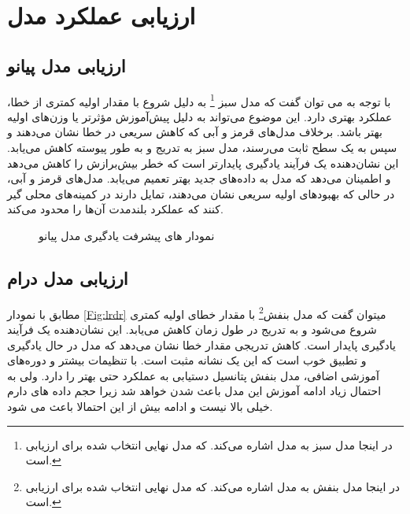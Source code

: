 \section{ارزیابی عملکرد مدل}
\subsection{ارزیابی مدل پیانو}

با توجه به  می توان گفت که مدل سبز \footnote{در اینجا مدل سبز به مدل   اشاره می‌کند. که مدل نهایی انتخاب شده برای ارزیابی است.} به دلیل شروع با مقدار اولیه کمتری از خطا، عملکرد بهتری دارد. این موضوع می‌تواند به دلیل پیش‌آموزش مؤثرتر یا وزن‌های اولیه بهتر باشد. برخلاف مدل‌های قرمز و آبی که کاهش سریعی در خطا نشان می‌دهند و سپس به یک سطح ثابت می‌رسند، مدل سبز به تدریج و به طور پیوسته کاهش می‌یابد. این نشان‌دهنده یک فرآیند یادگیری پایدارتر است که خطر بیش‌برازش را کاهش می‌دهد و اطمینان می‌دهد که مدل به داده‌های جدید بهتر تعمیم می‌یابد. مدل‌های قرمز و آبی، در حالی که بهبودهای اولیه سریعی نشان می‌دهند، تمایل دارند در کمینه‌های محلی گیر کنند که عملکرد بلندمدت آن‌ها را محدود می‌کند.
\begin{figure}%
      \centering
      \qquad
      \caption{نمودار های پیشرفت یادگیری مدل پیانو}%
      \label{Fig:lrpi}%
\end{figure}


\subsection{ارزیابی مدل درام}
مطابق با نمودار \ref{Fig:lrdr} میتوان گفت که
مدل بنفش\footnote{در اینجا مدل بنفش به مدل   اشاره می‌کند. که مدل نهایی انتخاب شده برای ارزیابی است.} با مقدار خطای اولیه کمتری شروع می‌شود و به تدریج در طول زمان کاهش می‌یابد. این نشان‌دهنده یک فرآیند یادگیری پایدار است.
کاهش تدریجی مقدار خطا نشان می‌دهد که مدل در حال یادگیری و تطبیق خوب است که این یک نشانه مثبت است. با تنظیمات بیشتر و دوره‌های آموزشی اضافی، مدل بنفش پتانسیل دستیابی به عملکرد حتی بهتر را دارد. ولی به احتمال زیاد ادامه آموزش این مدل باعث  شدن خواهد شد زیرا حجم داده های دارم خیلی بالا نیست و ادامه بیش از این احتمالا باعث  می شود.


